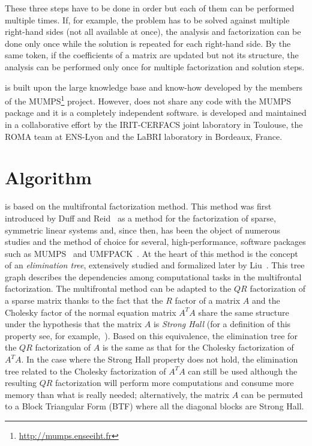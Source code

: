 \documentclass[11pt]{article}
\begin{document}
These three steps have to be done in order but each of them can be
performed multiple times. If, for example, the problem has to be
solved against multiple right-hand sides (not all available at once),
the analysis and factorization can be done only once while the
solution is repeated for each right-hand side. By the same token, if
the coefficients of a matrix are updated but not its structure, the
analysis can be performed only once for multiple factorization and
solution steps.

\qrm is built upon the large knowledge base and know-how developed by
the members of the MUMPS\footnote{\url{http://mumps.enseeiht.fr}}
project. However, \qrm does not share any code with the MUMPS package
and it is a completely independent software. \qrm is developed and
maintained in a collaborative effort by the IRIT-CERFACS joint
laboratory in Toulouse, the ROMA team at ENS-Lyon and the LaBRI
laboratory in Bordeaux, France.



\section{Algorithm}
\label{sec:algo}

\qrm is based on the multifrontal factorization method. This method
was first introduced by Duff and Reid~\cite{dure:83} as a method for
the factorization of sparse, symmetric linear systems and, since then,
has been the object of numerous studies and the method of choice for
several, high-performance, software packages such as
MUMPS~\cite{adkl:00} and UMFPACK~\cite{davis:04}. At the heart of this
method is the concept of an {\it elimination tree}, extensively
studied and formalized later by Liu~\cite{liu:90}. This tree graph
describes the dependencies among computational tasks in the
multifrontal factorization. The multifrontal method can be adapted to
the $QR$ factorization of a sparse matrix thanks to the fact that the
$R$ factor of a matrix $A$ and the Cholesky factor of the normal
equation matrix $A^TA$ share the same structure under the hypothesis
that the matrix $A$ is {\it Strong Hall} (for a definition of this
property see, for example,~\cite{bjor:96}). Based on this equivalence,
the elimination tree for the $QR$ factorization of $A$ is the same as
that for the Cholesky factorization of $A^TA$. In the case where the
Strong Hall property does not hold, the elimination tree related to
the Cholesky factorization of $A^TA$ can still be used although the
resulting $QR$ factorization will perform more computations and
consume more memory than what is really needed; alternatively, the
matrix $A$ can be permuted to a Block Triangular Form (BTF) where all
the diagonal blocks are Strong Hall.
\end{document}
